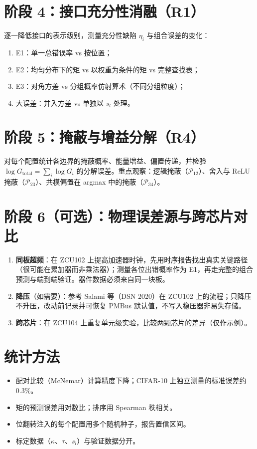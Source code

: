 \documentclass[11pt,a4paper]{ctexart}
\begin{document}
\section{阶段 4：接口充分性消融（R1）}
逐一降低接口的表示级别，测量充分性缺陷 $\eta_i$ 与组合误差的变化：
\begin{enumerate}[leftmargin=*]
  \item E1：单一总错误率 vs 按位置；
  \item E2：均匀分布下的矩 vs 以权重为条件的矩 vs 完整查找表；
  \item E3：对角方差 vs 分组概率仿射算术（不同分组粒度）；
  \item 大误差：并入方差 vs 单独以 $s_l$ 处理。
\end{enumerate}

\section{阶段 5：掩蔽与增益分解（R4）}
对每个配置统计各边界的掩蔽概率、能量增益、偏置传递，并检验 $\log G_{\text{total}} = \sum_i\log G_i$ 的分解误差。重点观察：逻辑掩蔽（$\mathcal P_{12}$）、舍入与 ReLU 掩蔽（$\mathcal P_{23}$）、共模偏置在 argmax 中的掩蔽（$\mathcal P_{34}$）。

\section{阶段 6（可选）：物理误差源与跨芯片对比}
\begin{enumerate}[leftmargin=*]
  \item \textbf{同板超频}：在 ZCU102 上提高加速器时钟，先用时序报告找出真实关键路径（很可能在累加器而非乘法器）；测量各位出错概率作为 E1，再走完整的组合预测与端到端验证。器件数据必须来自同一块板。
  \item \textbf{降压}（如需要）：参考 Salami 等（DSN 2020）在 ZCU102 上的流程；只降压不升压，改动前记录并可恢复 PMBus 默认值，不写入稳压器非易失存储。
  \item \textbf{跨芯片}：在 ZCU104 上重复单元级实验，比较两颗芯片的差异（仅作示例）。
\end{enumerate}

\section{统计方法}
\begin{itemize}[leftmargin=*]
  \item 配对比较（McNemar）计算精度下降；CIFAR-10 上独立测量的标准误差约 0.3\%。
  \item 矩的预测误差用对数比；排序用 Spearman 秩相关。
  \item 位翻转注入的每个配置用多个随机种子，报告置信区间。
  \item 标定数据（$\kappa$、$\tau$、$s_l$）与验证数据分开。
\end{itemize}
\end{document}
